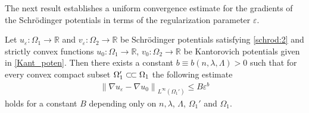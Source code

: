 \documentclass[reqno,12pt]{article}
\newcommand{\R}{\mathbb{R}}
\newcommand{\norm}[1]{\left\lVert#1\right\rVert}
\newcommand{\ssubset}{\subset\joinrel\subset}
\begin{document}
The next result establishes a uniform convergence estimate for the gradients of the Schr\"odinger potentials in terms of the regularization parameter $\varepsilon$.

\begin{lemma}
    \label{lem:1E}
    Let $u_{\varepsilon} : \Omega_1\rightarrow \R$ and $v_{\varepsilon} : \Omega_2\rightarrow \R$ be Schr\"odinger potentials satisfying \eqref{schrod:2} and strictly convex functions $u_0 : \Omega_{1}\rightarrow \R$, $v_{0} : \Omega_{2}\rightarrow \R$ be Kantorovich potentials given in \eqref{Kant_poten}. Then there exists a constant $b\equiv b(n,\lambda,\Lambda)>0$ such that for every convex compact subset $\Omega_{1}'\ssubset \Omega_{1}$ the following estimate 
    \begin{align}
        \label{lem:ABF:1}
        \norm{\nabla u_{\varepsilon}-\nabla u_0}_{L^{\infty}(\Omega_1')} \leqslant B\varepsilon^{b}
    \end{align}
    holds for a constant $B$ depending only on $n,\lambda$, $\Lambda$, $\Omega_{1}'$ and $\Omega_{1}$.
\end{lemma}
\end{document}
